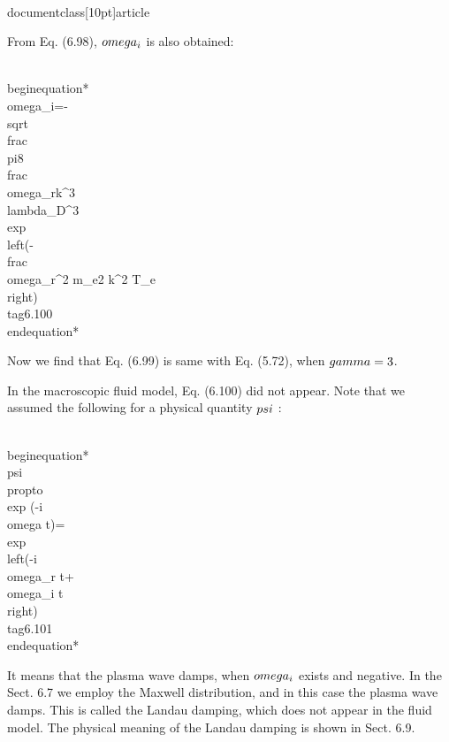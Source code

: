 \\documentclass[10pt]{article}
\begin{document}
{{{{From Eq. (6.98), $\\omega_{i}$ is also obtained:


\\begin{equation*}
\\omega_{i}=-\\sqrt{\\frac{\\pi}{8}} \\frac{\\omega_{r}}{k^{3} \\lambda_{D}^{3}} \\exp \\left(-\\frac{\\omega_{r}^{2} m_{e}}{2 k^{2} T_{e}}\\right) \\tag{6.100}
\\end{equation*}


Now we find that Eq. (6.99) is same with Eq. (5.72), when $\\gamma=3$.

In the macroscopic fluid model, Eq. (6.100) did not appear. Note that we assumed the following for a physical quantity $\\psi$ :


\\begin{equation*}
\\psi \\propto \\exp (-i \\omega t)=\\exp \\left(-i \\omega_{r} t+\\omega_{i} t\\right) \\tag{6.101}
\\end{equation*}


It means that the plasma wave damps, when $\\omega_{i}$ exists and negative. In the Sect. 6.7 we employ the Maxwell distribution, and in this case the plasma wave damps. This is called the Landau damping, which does not appear in the fluid model. The physical meaning of the Landau damping is shown in Sect. 6.9.

}}}}
\end{document}
